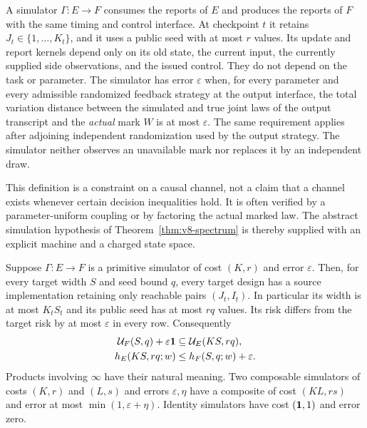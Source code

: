 \begin{definition}
\label{def:v11-simulator}
A simulator $\Gamma:E\longrightarrow F$ consumes the reports of $E$ and
produces the reports of $F$ with the same timing and control interface.
At checkpoint $t$ it retains $J_t\in\{1,\ldots,K_t\}$, and it uses a public
seed with at most $r$ values. Its update and report kernels depend only on
its old state, the current input, the currently supplied side observations,
and the issued control. They do not depend on the task or parameter.
The simulator has error $\varepsilon$ when, for every parameter and every
admissible randomized feedback strategy at the output interface, the total
variation distance between the simulated and true joint laws of the
output transcript and the \emph{actual} mark $W$ is at most $\varepsilon$.
The same requirement applies after adjoining independent randomization
used by the output strategy. The simulator neither observes an unavailable
mark nor replaces it by an independent draw.
\end{definition}

This definition is a constraint on a causal channel, not a claim that a
channel exists whenever certain decision inequalities hold. It is often
verified by a parameter-uniform coupling or by factoring the actual marked
law. The abstract simulation hypothesis of Theorem~\ref{thm:v8-spectrum}
is thereby supplied with an explicit machine and a charged state space.

\begin{theorem}
\label{thm:v11-comparison}
Suppose $\Gamma:E\longrightarrow F$ is a primitive simulator of cost
$(K,r)$ and error $\varepsilon$. Then, for every target width $S$ and seed
bound $q$, every target design has a source implementation retaining only
reachable pairs $(J_t,I_t)$. In particular its width is at most $K_tS_t$
and its public seed has at most $rq$ values. Its risk differs from the
target risk by at most $\varepsilon$ in every row. Consequently
\begin{align}
 \mathcal U_F(S,q)+\varepsilon\mathbf 1
       &\subseteq\mathcal U_E(KS,rq), \label{eq:v11-upper}\\
 h_E(KS,rq;w)&\le h_F(S,q;w)+\varepsilon.
 \label{eq:v11-support}
\end{align}
Products involving $\infty$ have their natural meaning.
Two composable simulators of costs $(K,r)$ and $(L,s)$ and errors
$\varepsilon,\eta$ have a composite of cost $(KL,rs)$ and error at most
$\min(1,\varepsilon+\eta)$. Identity simulators have cost $(\mathbf 1,1)$ and
error zero.
\end{theorem}

